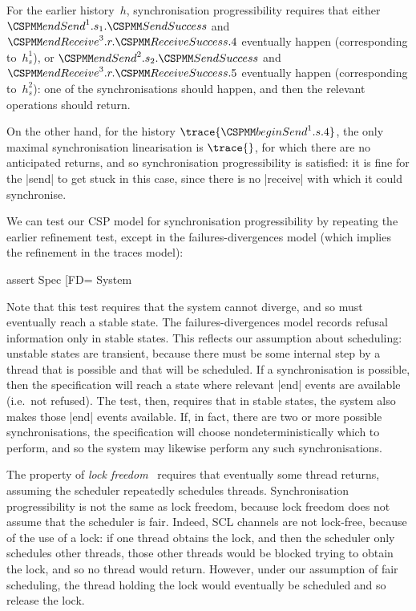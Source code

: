 For the earlier history~$h$, synchronisation progressibility requires that
either $\endSend^1.s_1.\SendSuccess$ and $\endReceive^3.r.\ReceiveSuccess.4$
eventually happen (corresponding to~$h_s^1$), or $\endSend^2.s_2.\SendSuccess$
and $\endReceive^3.r.\ReceiveSuccess.5$ eventually happen (corresponding
to~$h_s^2$): one of the synchronisations should happen, and then the relevant
operations should return.

On the other hand, for the history $\trace{\beginSend^1.s.4}$, the only
maximal synchronisation linearisation is $\trace{}$, for which there are no
anticipated returns, and so synchronisation progressibility is satisfied: it
is fine for the |send| to get stuck in this case, since there is no
|receive| with which it could synchronise.





We can test our CSP model for synchronisation progressibility by repeating the
earlier refinement test, except in the failures-divergences model (which
implies the refinement in the traces model):
%
\begin{cspm}
assert Spec [FD= System
\end{cspm}
%
Note that this test requires that the system cannot diverge, and so must
eventually reach a stable state.  The failures-divergences model records
refusal information only in stable states.  This reflects our assumption about
scheduling: unstable states are transient, because there must be some internal
step by a thread that is possible and that will be scheduled.  If a
synchronisation is possible, then the specification will reach a state where
relevant |end| events are available (i.e.~not refused).  The test, then,
requires that in stable states, the system also makes those |end| events
available.  If, in fact, there are two or more possible synchronisations, the
specification will choose nondeterministically which to perform, and so the
system may likewise perform any such synchronisations.

The property of \emph{lock freedom}~\cite{Herlihy-Shavit} requires that
eventually some thread returns, assuming the scheduler repeatedly schedules
threads.  Synchronisation progressibility is not the same as lock freedom,
because lock freedom does not assume that the scheduler is fair.  Indeed, SCL
channels are not lock-free, because of the use of a lock: if one thread
obtains the lock, and then the scheduler only schedules other threads, those
other threads would be blocked trying to obtain the lock, and so no thread
would return.  However, under our assumption of fair scheduling, the thread
holding the lock would eventually be scheduled and so release the lock.

